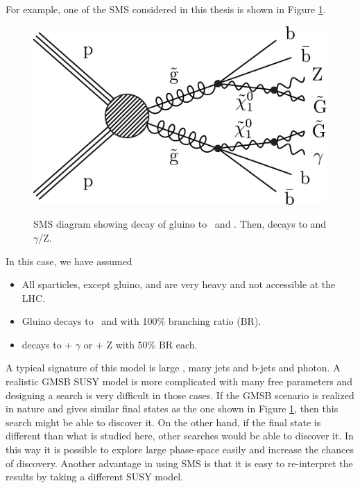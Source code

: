 For example, one of the SMS considered in this thesis is shown in Figure \ref{fig:T5bbbbZG_sms}. 
\begin{figure}[htb]
\centering
\includegraphics[width=0.4\linewidth]{../Figures/Chap1/Figure_001-b.pdf}\\
\caption[SMS diagrams]{SMS diagram showing decay of gluino to \bbbar\ and \nuone. Then, \nuone decays to \grav and $\gamma$/Z.}
\label{fig:T5bbbbZG_sms}
\end{figure}
In this case, we have assumed
\begin{itemize}
\item All sparticles, except gluino, \nuone and \grav are very heavy and not accessible at the LHC.
\item Gluino decays to \bbbar\ and \nuone with 100\% branching ratio (BR).
\item \nuone decays to \grav + $\gamma$ or \grav + Z with 50\% BR each.
\end{itemize}
A typical signature of this model is large \ptmiss, many jets and b-jets and photon. A realistic GMSB SUSY model is more complicated
with many free parameters and designing a search is very difficult in those cases. If the GMSB scenario is realized in nature
and gives similar final states as the one shown in Figure \ref{fig:T5bbbbZG_sms}, then this search might be able to discover it.
On the other hand, if the final state is different than what is studied here, other searches would be able to discover it. In this way
it is possible to explore large phase-space easily and increase the chances of discovery.  Another advantage in using SMS 
is that it is easy to re-interpret the results by taking a different SUSY model.
